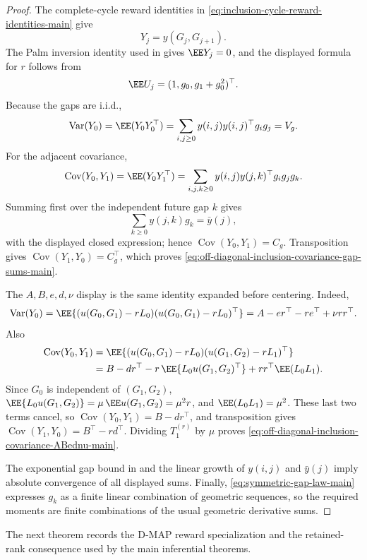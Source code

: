 \begin{proof}
The complete-cycle reward identities in
\eqref{eq:inclusion-cycle-reward-identities-main} give
\[
Y_j=y(G_j,G_{j+1}).
\]
The Palm inversion identity used in
 gives
\(\EE Y_j=0\), and the displayed formula for \(r\) follows from
\[
\EE U_j=(1,g_0,g_1+g_0^2)^\top .
\]
Because the gaps are i.i.d.,
\[
\operatorname{Var}(Y_0)=\EE(Y_0Y_0^\top)
=\sum_{i,j\ge0}y(i,j)y(i,j)^\top g_i g_j=V_g .
\]
For the adjacent covariance,
\[
\operatorname{Cov}(Y_0,Y_1)=\EE(Y_0Y_1^\top)
=\sum_{i,j,k\ge0}y(i,j)y(j,k)^\top g_i g_jg_k .
\]
Summing first over the independent future gap \(k\) gives
\[
\sum_{k\ge0}y(j,k)g_k=\bar y(j),
\]
with the displayed closed expression; hence
\(\operatorname{Cov}(Y_0,Y_1)=C_g\).  Transposition gives
\(\operatorname{Cov}(Y_1,Y_0)=C_g^\top\), which proves
\eqref{eq:off-diagonal-inclusion-covariance-gap-sums-main}.

The \(A,B,e,d,\nu\) display is the same identity expanded before centering.
Indeed,
\[
\operatorname{Var}(Y_0)
=\EE\{(u(G_0,G_1)-rL_0)(u(G_0,G_1)-rL_0)^\top\}
=A-er^\top-re^\top+\nu rr^\top .
\]
Also
\[
\begin{aligned}
\operatorname{Cov}(Y_0,Y_1)
&=\EE\{(u(G_0,G_1)-rL_0)(u(G_1,G_2)-rL_1)^\top\}\\
&=B-dr^\top-r\,\EE\{L_0u(G_1,G_2)^\top\}
  +rr^\top\EE(L_0L_1).
\end{aligned}
\]
Since \(G_0\) is independent of \((G_1,G_2)\),
\(\EE\{L_0u(G_1,G_2)\}=\mu\,\EE u(G_1,G_2)=\mu^2r\), and
\(\EE(L_0L_1)=\mu^2\).  These last two terms cancel, so
\(\operatorname{Cov}(Y_0,Y_1)=B-dr^\top\), and transposition gives
\(\operatorname{Cov}(Y_1,Y_0)=B^\top-rd^\top\).  Dividing
\(T_1^{(r)}\) by \(\mu\) proves
\eqref{eq:off-diagonal-inclusion-covariance-ABednu-main}.

The exponential gap bound in
 and the linear growth
of \(y(i,j)\) and \(\bar y(j)\) imply absolute convergence of all displayed
sums.  Finally, \eqref{eq:symmetric-gap-law-main} expresses \(g_k\) as a
finite linear combination of geometric sequences, so the required moments are
finite combinations of the usual geometric derivative sums.
\end{proof}

The next theorem records the D-MAP reward specialization and the retained-rank
consequence used by the main inferential theorems.

